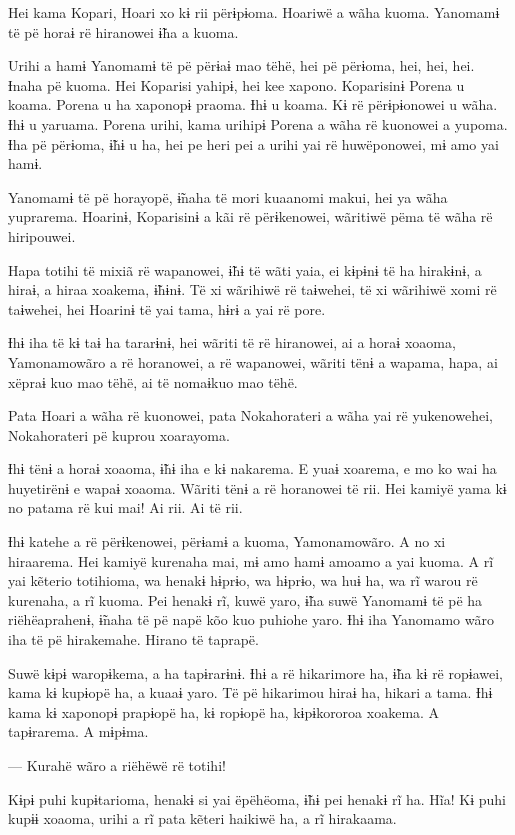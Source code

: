 Hei kama Kopari, Hoari xo kɨ rii përɨpɨoma. Hoariwë a wãha kuoma.
Yanomamɨ të pë horaɨ rë hiranowei ɨ̃ha a kuoma. 

Urihi a hamɨ Yanomamɨ të pë përɨaɨ mao tëhë, hei pë përɨoma, hei, hei,
hei. Ɨnaha pë kuoma. Hei Koparisi yahipɨ, hei kee xapono. Koparisinɨ
Porena u koama. Porena u ha xaponopɨ praoma. Ɨhɨ u koama. Kɨ rë
përɨpɨonowei u wãha. Ɨhɨ u yaruama. Porena urihi, kama urihipɨ Porena a
wãha rë kuonowei a yupoma. Ɨha pë përɨoma, ɨ̃hɨ u ha, hei pe heri pei a
urihi yai rë huwëponowei, mɨ amo yai hamɨ. 

Yanomamɨ të pë horayopë, ɨ̃naha të mori kuaanomi makui, hei ya wãha
yuprarema. Hoarinɨ, Koparisinɨ a kãi rë përɨkenowei, wãritiwë pëma të
wãha rë hiripouwei. 

Hapa totihi të mixiã rë wapanowei, ɨ̃hɨ të wãti yaia, ei kɨpɨnɨ të ha
hirakɨnɨ, a hiraɨ, a hiraa xoakema, ɨ̃hɨnɨ. Të xi wãrihiwë rë taɨwehei,
të xi wãrihiwë xomi rë taɨwehei, hei Hoarinɨ të yai tama, hɨrɨ a yai rë
pore. 

Ɨhɨ iha të kɨ taɨ ha tararɨnɨ, hei wãriti të rë hiranowei, ai a horaɨ
xoaoma, Yamonamowãro a rë horanowei, a rë wapanowei, wãriti tënɨ a
wapama, hapa, ai xëpraɨ kuo mao tëhë, ai të nomaɨkuo mao tëhë. 

Pata Hoari a wãha rë kuonowei, pata Nokahorateri a wãha yai rë
yukenowehei, Nokahorateri pë kuprou xoarayoma. 

Ɨhɨ tënɨ a horaɨ xoaoma, ɨ̃hɨ iha e kɨ nakarema. E yuaɨ xoarema, e mo ko
wai ha huyetirënɨ e wapaɨ xoaoma. Wãriti tënɨ a rë horanowei të rii. Hei
kamiyë yama kɨ no patama rë kui mai! Ai rii. Ai të rii. 

Ɨhɨ katehe a rë përɨkenowei, përɨamɨ a kuoma, Yamonamowãro. A no xi
hiraarema. Hei kamiyë kurenaha mai, mɨ amo hamɨ amoamo a yai kuoma. A rĩ
yai kẽterio totihioma, wa henakɨ hɨprɨo, wa hɨprɨo, wa huɨ ha, wa rĩ
warou rë kurenaha, a rĩ kuoma. Pei henakɨ rĩ, kuwë yaro, ɨ̃ha suwë
Yanomamɨ të pë ha riëhëaprahenɨ, ɨ̃naha të pë napë kõo kuo puhiohe yaro.
Ɨhɨ iha Yanomamo wãro iha të pë hirakemahe. Hirano të taprapë. 

Suwë kɨpɨ waropɨkema, a ha tapɨrarɨnɨ. Ɨhɨ a rë hikarimore ha, ɨ̃ha kɨ rë
ropɨawei, kama kɨ kupɨopë ha, a kuaaɨ yaro. Të pë hikarimou hiraɨ ha,
hikari a tama. Ɨhɨ kama kɨ xaponopɨ prapɨopë ha, kɨ ropɨopë ha,
kɨpɨkororoa xoakema. A tapɨrarema. A mɨpɨma. 

--- Kurahë wãro a riëhëwë rë totihi! 

Kɨpɨ puhi kupɨtarioma, henakɨ si yai ëpëhëoma, ɨ̃hɨ pei henakɨ rĩ ha.
Hĩa! Kɨ puhi kupɨɨ xoaoma, urihi a rĩ pata kẽteri haikiwë ha, a rĩ
hirakaama. 

